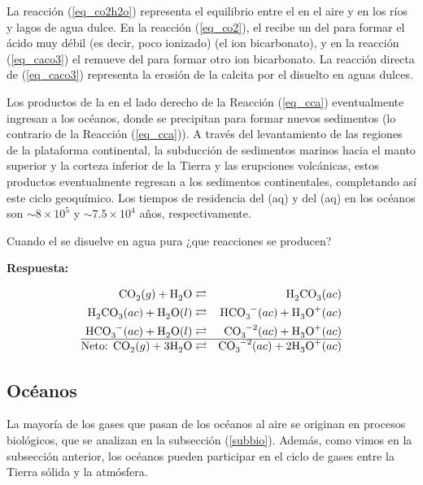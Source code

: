 La reacción (\ref{eq_co2h2o}) representa el equilibrio entre el  en el aire y en los ríos y lagos de agua dulce. En la reacción (\ref{eq_co2}), el  recibe un   del  para formar el ácido muy débil (es decir, poco ionizado)  (el ion bicarbonato), y en la reacción (\ref{eq_caco3}) el  remueve  del  para formar otro ion bicarbonato. La reacción directa de (\ref{eq_caco3}) representa la erosión de la calcita por el   disuelto en aguas dulces.

Los productos de la  en el lado derecho de la Reacción (\ref{eq_cca}) eventualmente ingresan a los océanos, donde se precipitan para formar nuevos sedimentos (lo contrario de la Reacción (\ref{eq_cca})). A través del levantamiento de las regiones de la plataforma continental, la subducción de sedimentos marinos hacia el manto superior y la corteza inferior de la Tierra y las erupciones volcánicas, estos productos eventualmente regresan a los sedimentos continentales, completando así este ciclo geoquímico. Los tiempos de residencia del (aq) y del (aq) en los océanos son $\sim 8\times 10^5$ y $\sim7.5 \times 10^4$ años, respectivamente.

\begin{example}
Cuando el  se disuelve en agua pura ¿que reacciones se producen?

\textbf{Respuesta:}

\begin{footnotesize}
\begin{eqnarray}
\ce{CO2}(g) + \ce{H2O} &\rightleftarrows& \ce{H2CO3}(ac) \\
\ce{H2CO3}(ac) + \ce{H2O}(l) &\rightleftarrows&  \ce{HCO3^-}(ac) + \ce{H3O^+}(ac) \\
 \ce{HCO3^-}(ac) + \ce{H2O}(l) &\rightleftarrows&  \ce{CO3^{-2}}(ac) + \ce{H3O^+}(ac) \\ \hline
 \textrm{Neto:         } \ce{CO2}(g) + 3\ce{H2O} &\rightleftarrows& \ce{CO3^{-2}}(ac) +2 \ce{H3O^+}(ac) 
 \end{eqnarray}
\end{footnotesize}
\end{example}

\subsection{Oc\'eanos}
La mayoría de los gases que pasan de los océanos al aire se originan en procesos biológicos, que se analizan en la subsección (\ref{subbio}). Además, como vimos en la subsección anterior, los océanos pueden participar en el ciclo de gases entre la Tierra sólida y la atmósfera. 

